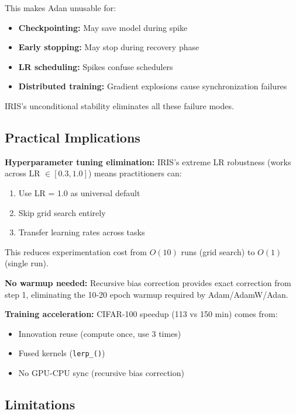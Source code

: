 This makes Adan unusable for:
\begin{itemize}
    \item \textbf{Checkpointing:} May save model during spike
    \item \textbf{Early stopping:} May stop during recovery phase
    \item \textbf{LR scheduling:} Spikes confuse schedulers
    \item \textbf{Distributed training:} Gradient explosions cause synchronization failures
\end{itemize}

IRIS's unconditional stability eliminates all these failure modes.

\subsection{Practical Implications}

\textbf{Hyperparameter tuning elimination:} IRIS's extreme LR robustness (works across LR $\in [0.3, 1.0]$) means practitioners can:
\begin{enumerate}
    \item Use LR = 1.0 as universal default
    \item Skip grid search entirely
    \item Transfer learning rates across tasks
\end{enumerate}

This reduces experimentation cost from $O(10)$ runs (grid search) to $O(1)$ (single run).

\textbf{No warmup needed:} Recursive bias correction provides exact correction from step 1, eliminating the 10-20 epoch warmup required by Adam/AdamW/Adan.

\textbf{Training acceleration:} CIFAR-100 speedup (113 vs 150 min) comes from:
\begin{itemize}
    \item Innovation reuse (compute once, use 3 times)
    \item Fused kernels (\texttt{lerp\_()})
    \item No GPU-CPU sync (recursive bias correction)
\end{itemize}

\subsection{Limitations}

